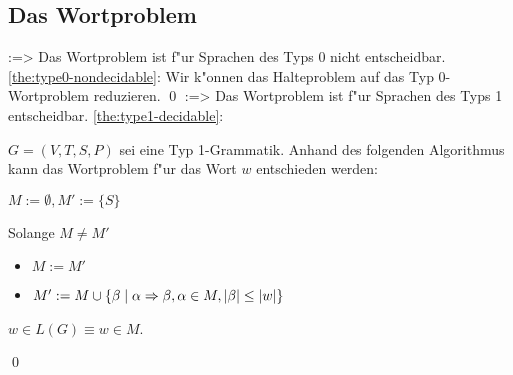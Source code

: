 \subsection{Das Wortproblem}
\theorem:=>{
  \label{the:type0-nondecidable}
  Das Wortproblem ist f"ur Sprachen des Typs 0 nicht entscheidbar.
  }
\proof \ref{the:type0-nondecidable}:{
  Wir k"onnen das Halteproblem auf das Typ 0-Wortproblem reduzieren. \qed
  }
\theorem:=>{
  \label{the:type1-decidable}
  Das Wortproblem ist f"ur Sprachen des Typs 1 entscheidbar.
  }
\proof \ref{the:type1-decidable}:{
  $G=(V,T,S,P)$ sei eine Typ 1-Grammatik. Anhand des folgenden
  Algorithmus kann das Wortproblem f"ur das Wort $w$ entschieden werden:
  \begin{proc}
    \item $M:=\emptyset,M':=\{S\}$
    \item Solange $M\ne M'$ \begin{itemize}
      \item $M:=M'$
      \item $M':=M\cup \{\beta\mid\alpha\Rightarrow\beta,\alpha\in M,|\beta|\le|w|\}$
      \end{itemize}
    \item $w\in L(G)\equiv w\in M$.
    \end{proc}
  \qed
  }
